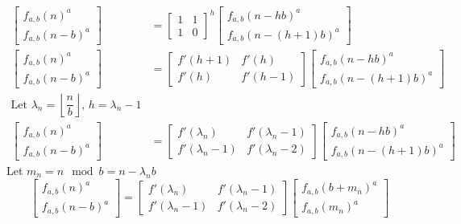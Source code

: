 \documentclass[preprint,12pt]{elsarticle}
\begin{document}
\begin{align*}
	\begin{bmatrix}f_{a,b}(n)^a \\f_{a,b}(n - b)^a\end{bmatrix}
	&=
	\begin{bmatrix}1             & 1                 \\1 & 0\end{bmatrix}^h
	\begin{bmatrix}f_{a,b}(n - hb)^a\\f_{a,b}(n-(h+1)b)^a\end{bmatrix}\\
	\begin{bmatrix}f_{a,b}(n)^a \\f_{a,b}(n - b)^a\end{bmatrix}
	&=
	\begin{bmatrix}f'(h+1)       & f'(h)             \\f'(h) & f'(h-1)\end{bmatrix}
	\begin{bmatrix}f_{a,b}(n - hb)^a\\f_{a,b}(n-(h+1)b)^a\end{bmatrix}\\
	\text{Let $\lambda_{n}=\left\lfloor\dfrac{n}{b}\right\rfloor$, $h = \lambda_{n} - 1$}\\
	\begin{bmatrix}f_{a,b}(n)^a \\f_{a,b}(n - b)^a\end{bmatrix}
	&=
	\begin{bmatrix}f'(\lambda_n) & f'(\lambda_{n}-1) \\f'(\lambda_n-1) & f'(\lambda_n-2)\end{bmatrix}
	\begin{bmatrix}f_{a,b}(n - hb)^a\\f_{a,b}(n-(h+1)b)^a\end{bmatrix}
\end{align*}
Let $m_n = n \mod b = n - \lambda_nb$\\
$$\begin{bmatrix}f_{a,b}(n)^a \\f_{a,b}(n - b)^a\end{bmatrix}
=
\begin{bmatrix}f'(\lambda_n) & f'(\lambda_{n}-1)\\f'(\lambda_n-1) & f'(\lambda_n-2)\end{bmatrix}
\begin{bmatrix}f_{a,b}(b+m_n)^a\\f_{a,b}(m_n)^a\end{bmatrix}$$
\end{document}
